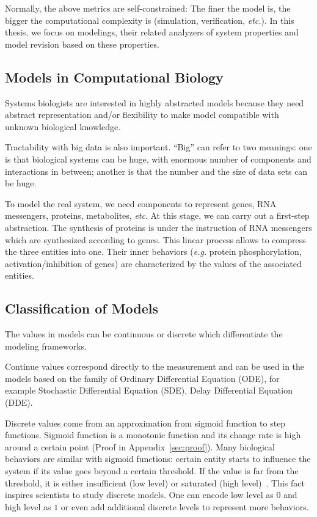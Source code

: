 Normally, the above metrics are self-constrained:
The finer the model is, the bigger the computational complexity is (simulation, verification, \textit{etc.}).
In this thesis, we focus on modelings, their related analyzers of system properties and model revision based on these properties.

\subsection{Models in Computational Biology}
Systems biologists are interested in highly abstracted models because they need abstract representation and/or flexibility to make model compatible with unknown biological knowledge.

Tractability with big data is also important.
``Big'' can refer to two meanings: one is that biological systems can be huge, with enormous number of components and interactions in between; another is that the number and the size of data sets can be huge.

To model the real system, we need components to represent genes, RNA messengers, proteins, metabolites, \textit{etc}.
At this stage, we can carry out a first-step abstraction.
The synthesis of proteins is under the instruction of RNA messengers which are synthesized according to genes.
This linear process allows  to compress the three entities into one.
Their inner behaviors (\textit{e.g.} protein phosphorylation, activation/inhibition of genes) are characterized by the values of the associated entities.

\subsection{Classification of Models}

The values in models can be continuous or discrete which differentiate the modeling frameworks.

Continue values correspond directly to the measurement and can be used in the models based on the family of Ordinary Differential Equation (ODE), for example Stochastic Differential Equation (SDE), Delay Differential Equation (DDE).

Discrete values come from an approximation from sigmoid function to step functions. 
Sigmoid function is a monotonic function and its change rate is high around a certain point (Proof in Appendix~\ref{sec:proof}).
Many biological behaviors are similar with sigmoid functions: certain entity starts to influence the system if its value goes beyond a certain threshold.
If the value is far from the threshold, it is either insufficient (low level) or saturated (high level)~\cite{kauffman1969,von2000segment}.
This fact inspires scientists to study discrete models.
One can encode low level as $0$ and high level as $1$ or even add additional discrete levels to represent more behaviors.

